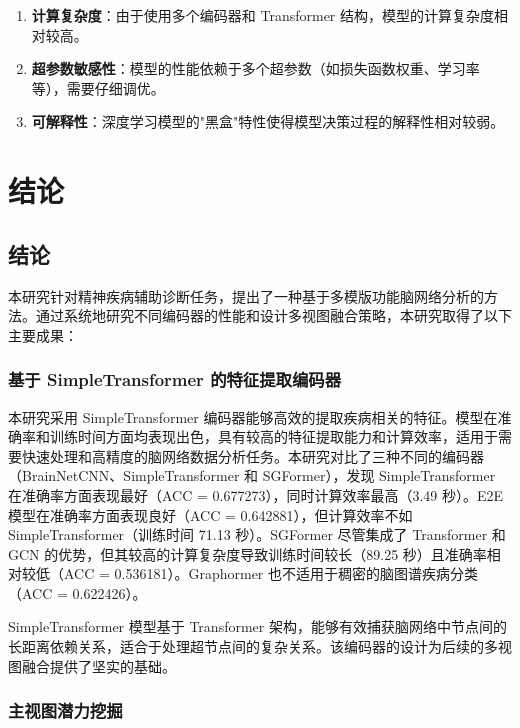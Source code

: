 \documentclass[12pt,a4paper]{article}
\begin{document}
\begin{enumerate}
\item \textbf{计算复杂度}：由于使用多个编码器和 Transformer 结构，模型的计算复杂度相对较高。

\item \textbf{超参数敏感性}：模型的性能依赖于多个超参数（如损失函数权重、学习率等），需要仔细调优。

\item \textbf{可解释性}：深度学习模型的"黑盒"特性使得模型决策过程的解释性相对较弱。
\end{enumerate}

\section{结论}

\subsection{结论}

本研究针对精神疾病辅助诊断任务，提出了一种基于多模版功能脑网络分析的方法。通过系统地研究不同编码器的性能和设计多视图融合策略，本研究取得了以下主要成果：

\subsubsection{基于 SimpleTransformer 的特征提取编码器}

本研究采用 SimpleTransformer 编码器能够高效的提取疾病相关的特征。模型在准确率和训练时间方面均表现出色，具有较高的特征提取能力和计算效率，适用于需要快速处理和高精度的脑网络数据分析任务。本研究对比了三种不同的编码器（BrainNetCNN、SimpleTransformer 和 SGFormer），发现 SimpleTransformer 在准确率方面表现最好（ACC = 0.677273），同时计算效率最高（3.49 秒）。E2E 模型在准确率方面表现良好（ACC = 0.642881），但计算效率不如 SimpleTransformer（训练时间 71.13 秒）。SGFormer 尽管集成了 Transformer 和 GCN 的优势，但其较高的计算复杂度导致训练时间较长（89.25 秒）且准确率相对较低（ACC = 0.536181）。Graphormer 也不适用于稠密的脑图谱疾病分类（ACC = 0.622426）。

SimpleTransformer 模型基于 Transformer 架构，能够有效捕获脑网络中节点间的长距离依赖关系，适合于处理超节点间的复杂关系。该编码器的设计为后续的多视图融合提供了坚实的基础。

\subsubsection{主视图潜力挖掘}
\end{document}
